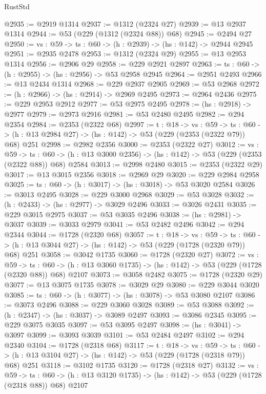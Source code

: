 \begin{lexlean}{RustStd}
\begin{coremodule}
@2935 := @2919 @1314
@2937 := @1312 (@2324 @27)
@2939 := @13 @2937 @1314
@2944 := @53 (@229 (@1312 (@2324 @88)) @68)
@2945 := @2494 @27
@2950 := {vs : @59} -> {ts : @60} -> (h : @2939) -> (hs : @142) -> @2944 @2945
@2951 := @2935 @2478
@2953 := @1312 (@2324 @29)
@2955 := @13 @2953 @1314
@2956 := @2906 @29
@2958 := @229 @2921 @2897
@2963 := {ts : @60} -> (h : @2955) -> (hs : @2956) -> @53 @2958 @2945
@2964 := @2951 @2493
@2966 := @13 @2434 @1314
@2968 := @229 @2937 @2905
@2969 := @53 @2968
@2972 := (h : @2966) -> (hs : @2914) -> @2969 @2495
@2973 := @2964 @2436
@2975 := @229 @2953 @2912
@2977 := @53 @2975 @2495
@2978 := (hs : @2918) -> @2977
@2979 := @2973 @2916
@2981 := @53 @2480 @2495
@2982 := @294 @2354
@2984 := @2353 (@2322 @68)
@2997 := {t : @18} ->
  {vs : @59} ->
  {ts : @60} -> (h : @13 @2984 @27) -> (hs : @142) -> @53 (@229 (@2353 (@2322 @79)) @68) @251
@2998 := @2982 @2356
@3000 := @2353 (@2322 @27)
@3012 := {vs : @59} ->
  {ts : @60} -> (h : @13 @3000 @2356) -> (hs : @142) -> @53 (@229 (@2353 (@2322 @88)) @68) @2584
@3013 := @2998 @2480
@3015 := @2353 (@2322 @29)
@3017 := @13 @3015 @2356
@3018 := @2969 @29
@3020 := @229 @2984 @2958
@3025 := {ts : @60} -> (h : @3017) -> (hs : @3018) -> @53 @3020 @2584
@3026 := @3013 @2495
@3028 := @229 @3000 @2968
@3029 := @53 @3028
@3032 := (h : @2433) -> (hs : @2977) -> @3029 @2496
@3033 := @3026 @2431
@3035 := @229 @3015 @2975
@3037 := @53 @3035 @2496
@3038 := (hs : @2981) -> @3037
@3039 := @3033 @2979
@3041 := @53 @2482 @2496
@3042 := @294 @2344
@3044 := @1728 (@2320 @68)
@3057 := {t : @18} ->
  {vs : @59} ->
  {ts : @60} -> (h : @13 @3044 @27) -> (hs : @142) -> @53 (@229 (@1728 (@2320 @79)) @68) @251
@3058 := @3042 @1735
@3060 := @1728 (@2320 @27)
@3072 := {vs : @59} ->
  {ts : @60} -> (h : @13 @3060 @1735) -> (hs : @142) -> @53 (@229 (@1728 (@2320 @88)) @68) @2107
@3073 := @3058 @2482
@3075 := @1728 (@2320 @29)
@3077 := @13 @3075 @1735
@3078 := @3029 @29
@3080 := @229 @3044 @3020
@3085 := {ts : @60} -> (h : @3077) -> (hs : @3078) -> @53 @3080 @2107
@3086 := @3073 @2496
@3088 := @229 @3060 @3028
@3089 := @53 @3088
@3092 := (h : @2347) -> (hs : @3037) -> @3089 @2497
@3093 := @3086 @2345
@3095 := @229 @3075 @3035
@3097 := @53 @3095 @2497
@3098 := (hs : @3041) -> @3097
@3099 := @3093 @3039
@3101 := @53 @2484 @2497
@3102 := @294 @2340
@3104 := @1728 (@2318 @68)
@3117 := {t : @18} ->
  {vs : @59} ->
  {ts : @60} -> (h : @13 @3104 @27) -> (hs : @142) -> @53 (@229 (@1728 (@2318 @79)) @68) @251
@3118 := @3102 @1735
@3120 := @1728 (@2318 @27)
@3132 := {vs : @59} ->
  {ts : @60} -> (h : @13 @3120 @1735) -> (hs : @142) -> @53 (@229 (@1728 (@2318 @88)) @68) @2107

\end{coremodule}
\end{lexlean}
